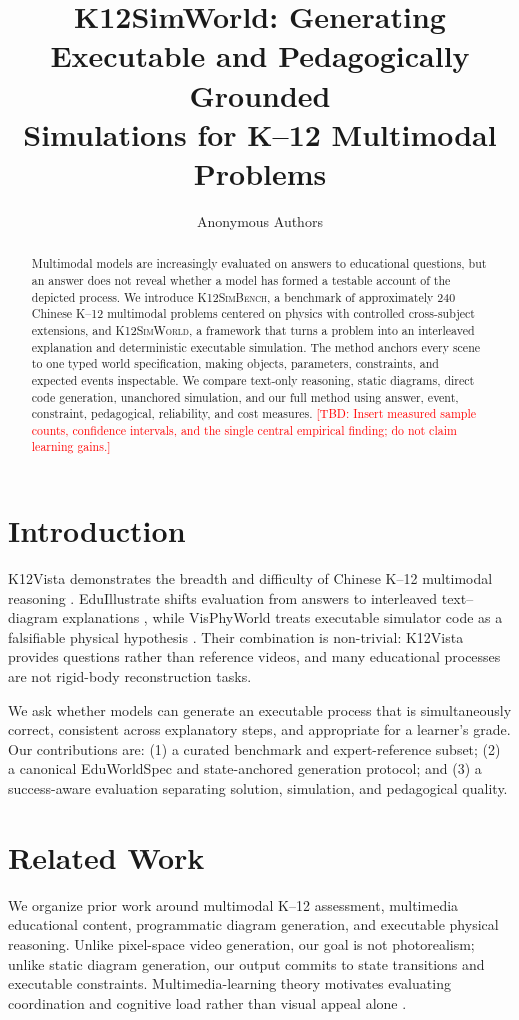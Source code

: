 \documentclass[11pt]{article}
\title{K12SimWorld: Generating Executable and Pedagogically Grounded\\
Simulations for K--12 Multimodal Problems}
\author{Anonymous Authors}
\date{}
\newcommand{\system}{\textsc{K12SimWorld}}
\newcommand{\benchmark}{\textsc{K12SimBench}}
\newcommand{\tbd}[1]{\textcolor{red}{[TBD: #1]}}
\begin{document}
\maketitle

\begin{abstract}
Multimodal models are increasingly evaluated on answers to educational questions, but an
answer does not reveal whether a model has formed a testable account of the depicted process.
We introduce \benchmark, a benchmark of approximately 240 Chinese K--12 multimodal problems
centered on physics with controlled cross-subject extensions, and \system, a framework that
turns a problem into an interleaved explanation and deterministic executable simulation.
The method anchors every scene to one typed world specification, making objects, parameters,
constraints, and expected events inspectable. We compare text-only reasoning, static diagrams,
direct code generation, unanchored simulation, and our full method using answer, event,
constraint, pedagogical, reliability, and cost measures. \tbd{Insert measured sample counts,
confidence intervals, and the single central empirical finding; do not claim learning gains.}
\end{abstract}

\section{Introduction}
K12Vista demonstrates the breadth and difficulty of Chinese K--12 multimodal reasoning
\cite{li2025k12vista}. EduIllustrate shifts evaluation from answers to interleaved text--diagram
explanations \cite{bi2026eduillustrate}, while VisPhyWorld treats executable simulator code as a
falsifiable physical hypothesis \cite{liang2026visphyworld}. Their combination is non-trivial:
K12Vista provides questions rather than reference videos, and many educational processes are
not rigid-body reconstruction tasks.

We ask whether models can generate an executable process that is simultaneously correct,
consistent across explanatory steps, and appropriate for a learner's grade. Our contributions
are: (1) a curated benchmark and expert-reference subset; (2) a canonical EduWorldSpec and
state-anchored generation protocol; and (3) a success-aware evaluation separating solution,
simulation, and pedagogical quality.

\section{Related Work}
We organize prior work around multimodal K--12 assessment, multimedia educational content,
programmatic diagram generation, and executable physical reasoning. Unlike pixel-space video
generation, our goal is not photorealism; unlike static diagram generation, our output commits
to state transitions and executable constraints. Multimedia-learning theory motivates evaluating
coordination and cognitive load rather than visual appeal alone \cite{mayer2002multimedia,
sweller1988cognitive,paivio1971imagery}.
\end{document}
